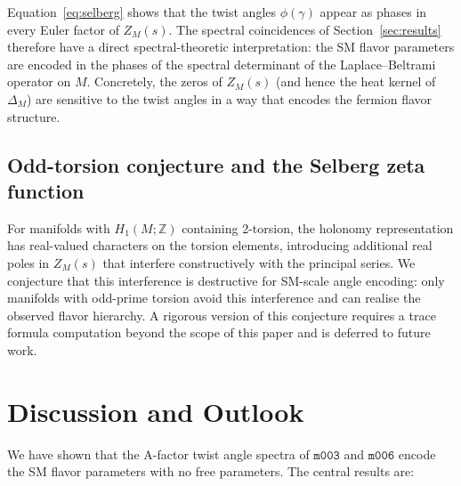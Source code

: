 \documentclass[11pt,a4paper]{article}
\newcommand{\mfld}[1]{\texttt{#1}}
\begin{document}
Equation~\eqref{eq:selberg} shows that the twist angles $\phi(\gamma)$ appear
as phases in every Euler factor of $Z_M(s)$.
The spectral coincidences of Section~\ref{sec:results} therefore have a direct
spectral-theoretic interpretation: the SM flavor parameters are encoded in the
phases of the spectral determinant of the Laplace--Beltrami operator on $M$.
Concretely, the zeros of $Z_M(s)$ (and hence the heat kernel of $\Delta_M$)
are sensitive to the twist angles in a way that encodes the fermion flavor
structure.

\subsection{Odd-torsion conjecture and the Selberg zeta function}

For manifolds with $H_1(M;\mathbb{Z})$ containing 2-torsion, the holonomy
representation has real-valued characters on the torsion elements, introducing
additional real poles in $Z_M(s)$ that interfere constructively with the
principal series.
We conjecture that this interference is destructive for SM-scale angle
encoding: only manifolds with odd-prime torsion avoid this interference and
can realise the observed flavor hierarchy.
A rigorous version of this conjecture requires a trace formula computation
beyond the scope of this paper and is deferred to future work.

\section{Discussion and Outlook}
\label{sec:discussion}

We have shown that the A-factor twist angle spectra of $\mfld{m003}$ and
$\mfld{m006}$ encode the SM flavor parameters with no free parameters.
The central results are:
\end{document}
